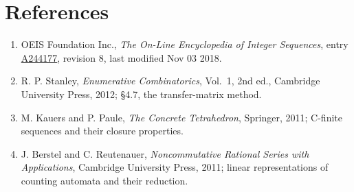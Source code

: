 \documentclass[11pt]{article}
\theoremstyle{definition}
\begin{document}
\section{References}

\begin{enumerate}

\item OEIS Foundation Inc., \emph{The On-Line Encyclopedia of Integer Sequences}, entry \href{https://oeis.org/A244177}{A244177}, revision 8, last modified Nov 03 2018.

\item R. P. Stanley, \emph{Enumerative Combinatorics}, Vol.~1, 2nd ed., Cambridge University Press, 2012; \S4.7, the transfer-matrix method.

\item M. Kauers and P. Paule, \emph{The Concrete Tetrahedron}, Springer, 2011; C-finite sequences and their closure properties.

\item J. Berstel and C. Reutenauer, \emph{Noncommutative Rational Series with Applications}, Cambridge University Press, 2011; linear representations of counting automata and their reduction.

\end{enumerate}
\end{document}
